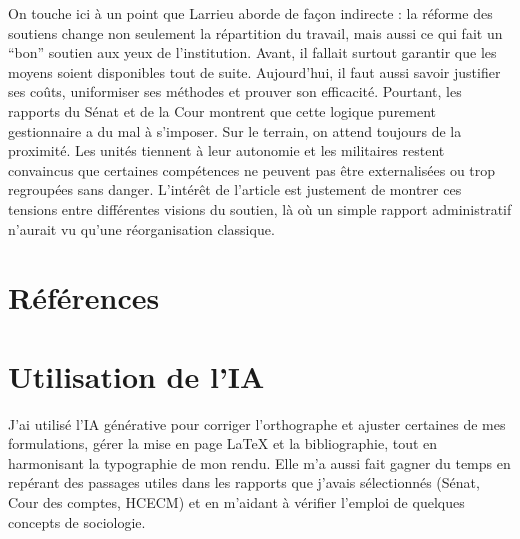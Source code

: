 \documentclass[12pt,a4paper]{article}
\begin{document}
On touche ici \`a un point que Larrieu aborde de fa\c con indirecte : la r\'eforme des soutiens change non seulement la r\'epartition du travail, mais aussi ce qui fait un ``bon'' soutien aux yeux de l'institution. Avant, il fallait surtout garantir que les moyens soient disponibles tout de suite. Aujourd'hui, il faut aussi savoir justifier ses co\^uts, uniformiser ses m\'ethodes et prouver son efficacit\'e. Pourtant, les rapports du S\'enat et de la Cour \parencite{RogerDulait2012BasesDefense,CourDesComptes2023SCA} montrent que cette logique purement gestionnaire a du mal \`a s'imposer. Sur le terrain, on attend toujours de la proximit\'e. Les unit\'es tiennent \`a leur autonomie et les militaires restent convaincus que certaines comp\'etences ne peuvent pas \^etre externalis\'ees ou trop regroup\'ees sans danger. L'int\'er\^et de l'article est justement de montrer ces tensions entre diff\'erentes visions du soutien, l\`a o\`u un simple rapport administratif n'aurait vu qu'une r\'eorganisation classique.

\section*{R\'ef\'erences}
\small
\printbibliography[heading=none]

\section*{Utilisation de l'IA}
\normalsize
J'ai utilis\'e l'IA g\'en\'erative pour corriger l'orthographe et ajuster certaines de mes formulations, g\'erer la mise en page \LaTeX{} et la bibliographie, tout en harmonisant la typographie de mon rendu. Elle m'a aussi fait gagner du temps en rep\'erant des passages utiles dans les rapports que j'avais s\'electionn\'es (S\'enat, Cour des comptes, HCECM) et en m'aidant \`a v\'erifier l'emploi de quelques concepts de sociologie.
\end{document}
